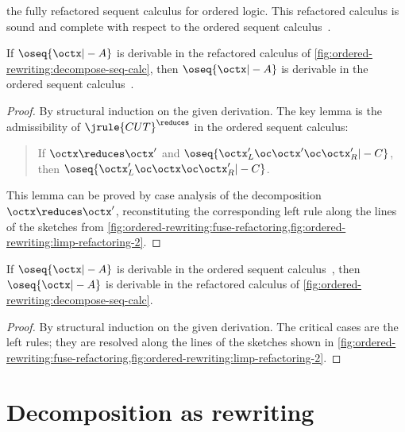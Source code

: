 the fully refactored sequent calculus for ordered logic.
This refactored calculus is sound and complete with respect to the ordered sequent calculus~.
%
\begin{theorem}[Soundness]
  If\/ $\oseq{\octx |- A}$ is derivable in the refactored calculus of \cref{fig:ordered-rewriting:decompose-seq-calc}, then $\oseq{\octx |- A}$ is derivable in the ordered sequent calculus~.
\end{theorem}
%
\begin{proof}
  By structural induction on the given derivation.
  The key lemma is the admissibility of $\jrule{CUT}^{\reduces}$ in the ordered sequent calculus:
  \begin{quotation}
    \normalsize If $\octx \reduces \octx'$ and $\oseq{\octx'_L \oc \octx' \oc \octx'_R |- C}$, then $\oseq{\octx'_L \oc \octx \oc \octx'_R |- C}$.
  \end{quotation}
  This lemma can be proved by case analysis of the decomposition $\octx \reduces \octx'$, reconstituting the corresponding left rule along the lines of the sketches from \cref{fig:ordered-rewriting:fuse-refactoring,fig:ordered-rewriting:limp-refactoring-2}.
\end{proof}
%
\begin{theorem}[Completeness]
  If\/ $\oseq{\octx |- A}$ is derivable in the ordered sequent calculus~, then $\oseq{\octx |- A}$ is derivable in the refactored calculus of \cref{fig:ordered-rewriting:decompose-seq-calc}.
\end{theorem}
%
\begin{proof}
  By structural induction on the given derivation.
  The critical cases are the left rules; they are resolved along the lines of the sketches shown in \cref{fig:ordered-rewriting:fuse-refactoring,fig:ordered-rewriting:limp-refactoring-2}.
\end{proof}




\section{Decomposition as rewriting}

